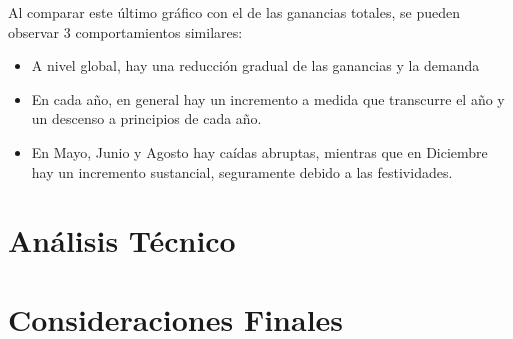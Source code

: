 \documentclass[12pt,a4paper]{article}
\begin{document}
Al comparar este último gráfico con el de las ganancias totales, se pueden observar 3 comportamientos similares: 
\begin{itemize}
    \item A nivel global, hay una reducción gradual de las ganancias y la demanda 
    \item En cada año, en general hay un incremento a medida que transcurre el año y un descenso a principios de cada año.
    \item En Mayo, Junio y Agosto hay caídas abruptas, mientras que en Diciembre hay un incremento sustancial, seguramente debido a las festividades.
\end{itemize}

\section{Análisis Técnico}

\section{Consideraciones Finales}
\end{document}
